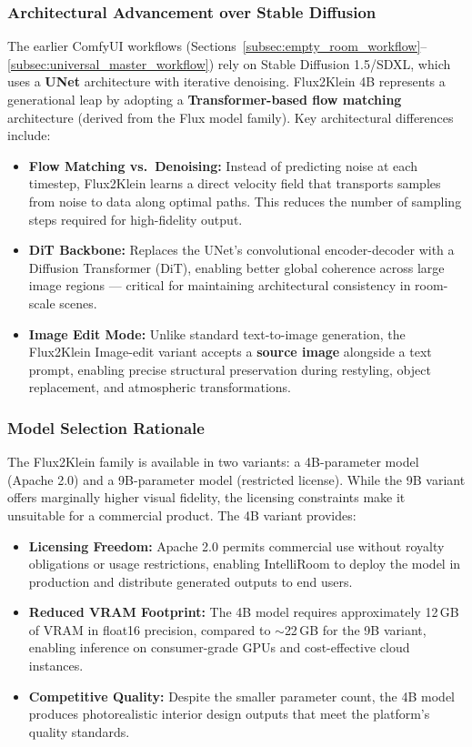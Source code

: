 \subsubsection*{Architectural Advancement over Stable Diffusion}

The earlier ComfyUI workflows (Sections~\ref{subsec:empty_room_workflow}--\ref{subsec:universal_master_workflow}) rely on Stable Diffusion 1.5/SDXL, which uses a \textbf{UNet} architecture with iterative denoising. Flux2Klein 4B represents a generational leap by adopting a \textbf{Transformer-based flow matching} architecture (derived from the Flux model family). Key architectural differences include:

\begin{itemize}
    \item \textbf{Flow Matching vs.\ Denoising:} Instead of predicting noise at each timestep, Flux2Klein learns a direct velocity field that transports samples from noise to data along optimal paths. This reduces the number of sampling steps required for high-fidelity output.
    \item \textbf{DiT Backbone:} Replaces the UNet's convolutional encoder-decoder with a Diffusion Transformer (DiT), enabling better global coherence across large image regions --- critical for maintaining architectural consistency in room-scale scenes.
    \item \textbf{Image Edit Mode:} Unlike standard text-to-image generation, the Flux2Klein Image-edit variant accepts a \textbf{source image} alongside a text prompt, enabling precise structural preservation during restyling, object replacement, and atmospheric transformations.
\end{itemize}

\subsubsection*{Model Selection Rationale}

The Flux2Klein family is available in two variants: a 4B-parameter model (Apache 2.0) and a 9B-parameter model (restricted license). While the 9B variant offers marginally higher visual fidelity, the licensing constraints make it unsuitable for a commercial product. The 4B variant provides:

\begin{itemize}
    \item \textbf{Licensing Freedom:} Apache 2.0 permits commercial use without royalty obligations or usage restrictions, enabling IntelliRoom to deploy the model in production and distribute generated outputs to end users.
    \item \textbf{Reduced VRAM Footprint:} The 4B model requires approximately 12\,GB of VRAM in float16 precision, compared to $\sim$22\,GB for the 9B variant, enabling inference on consumer-grade GPUs and cost-effective cloud instances.
    \item \textbf{Competitive Quality:} Despite the smaller parameter count, the 4B model produces photorealistic interior design outputs that meet the platform's quality standards.
\end{itemize}

